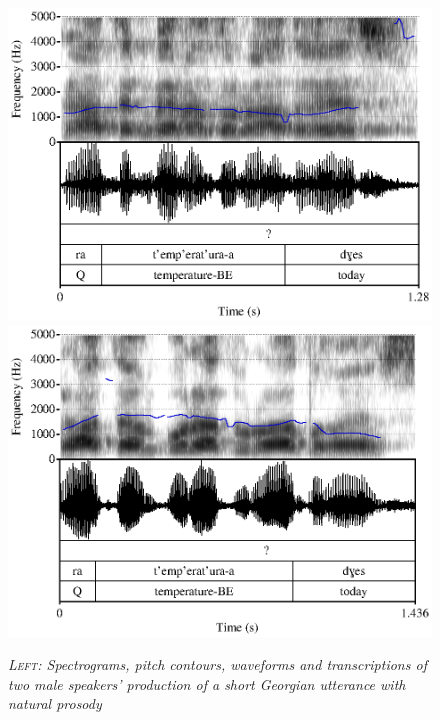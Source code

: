 \documentclass[12pt]{amsart}
\begin{document}
\newpage
\begin{figure}
    \centering
        \includegraphics[scale=0.5]{prosody1}
        \includegraphics[scale=0.5]{prosody2}
    \caption{\footnotesize{\textit{\textsc{Left:} Spectrograms, pitch contours, waveforms and transcriptions of two male speakers' production of a short Georgian utterance with natural prosody}}}\label{fig:temp}
\end{figure}




\end{document}
